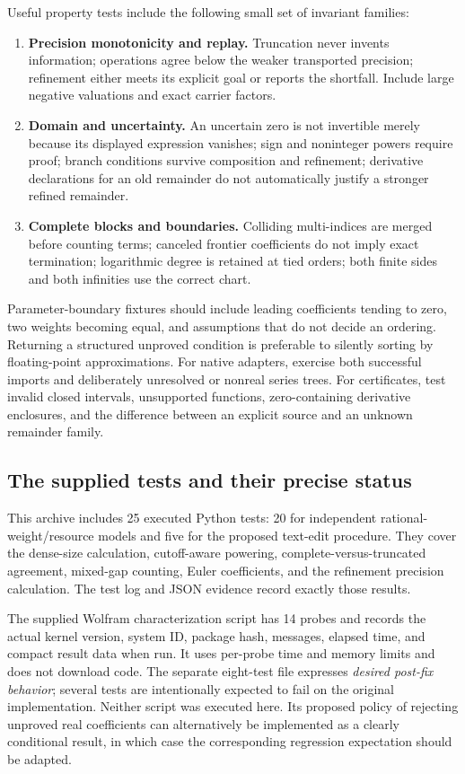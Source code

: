 \documentclass[11pt,a4paper]{article}
\newcommand{\code}[1]{\texttt{\detokenize{#1}}}
\begin{document}
Useful property tests include the following small set of invariant families:
\begin{enumerate}
\item \textbf{Precision monotonicity and replay.} Truncation never invents information; operations agree below the weaker transported precision; refinement either meets its explicit goal or reports the shortfall. Include large negative valuations and exact carrier factors.
\item \textbf{Domain and uncertainty.} An uncertain zero is not invertible merely because its displayed expression vanishes; sign and noninteger powers require proof; branch conditions survive composition and refinement; derivative declarations for an old remainder do not automatically justify a stronger refined remainder.
\item \textbf{Complete blocks and boundaries.} Colliding multi-indices are merged before counting terms; canceled frontier coefficients do not imply exact termination; logarithmic degree is retained at tied orders; both finite sides and both infinities use the correct chart.
\end{enumerate}

Parameter-boundary fixtures should include leading coefficients tending to zero, two weights becoming equal, and assumptions that do not decide an ordering. Returning a structured unproved condition is preferable to silently sorting by floating-point approximations. For native adapters, exercise both successful imports and deliberately unresolved or nonreal series trees. For certificates, test invalid closed intervals, unsupported functions, zero-containing derivative enclosures, and the difference between an explicit source and an unknown remainder family.

\subsection{The supplied tests and their precise status}

This archive includes 25 executed Python tests: 20 for independent rational-weight/resource models and five for the proposed text-edit procedure. They cover the dense-size calculation, cutoff-aware powering, complete-versus-truncated agreement, mixed-gap counting, Euler coefficients, and the refinement precision calculation. The test log and JSON evidence record exactly those results.

The supplied Wolfram characterization script has 14 probes and records the actual kernel version, system ID, package hash, messages, elapsed time, and compact result data when run. It uses per-probe time and memory limits and does not download code. The separate eight-test \code{proposed_regressions.wlt} file expresses \emph{desired post-fix behavior}; several tests are intentionally expected to fail on the original implementation. Neither script was executed here. Its proposed policy of rejecting unproved real coefficients can alternatively be implemented as a clearly conditional result, in which case the corresponding regression expectation should be adapted.
\end{document}
